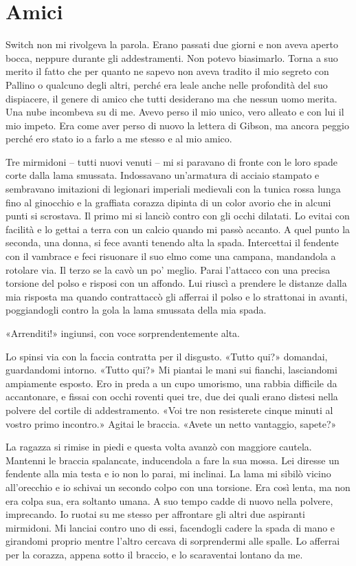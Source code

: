 \chapter{Amici}

Switch non mi rivolgeva la parola. Erano passati due giorni e non aveva
aperto bocca, neppure durante gli addestramenti. Non potevo biasimarlo.
Torna a suo merito il fatto che per quanto ne sapevo non aveva tradito
il mio segreto con Pallino o qualcuno degli altri, perché era leale
anche nelle profondità del suo dispiacere, il genere di amico che tutti
desiderano ma che nessun uomo merita. Una nube incombeva su di me. Avevo
perso il mio unico, vero alleato e con lui il mio impeto. Era come aver
perso di nuovo la lettera di Gibson, ma ancora peggio perché ero stato
io a farlo a me stesso e al mio amico.

Tre mirmidoni -- tutti nuovi venuti -- mi si paravano di fronte con le
loro spade corte dalla lama smussata. Indossavano un'armatura di acciaio
stampato e sembravano imitazioni di legionari imperiali medievali con la
tunica rossa lunga fino al ginocchio e la graffiata corazza dipinta di
un color avorio che in alcuni punti si scrostava. Il primo mi si lanciò
contro con gli occhi dilatati. Lo evitai con facilità e lo gettai a
terra con un calcio quando mi passò accanto. A quel punto la seconda,
una donna, si fece avanti tenendo alta la spada. Intercettai il fendente
con il vambrace e feci risuonare il suo elmo come una campana,
mandandola a rotolare via. Il terzo se la cavò un po' meglio. Parai
l'attacco con una precisa torsione del polso e risposi con un affondo.
Lui riuscì a prendere le distanze dalla mia risposta ma quando
contrattaccò gli afferrai il polso e lo strattonai in avanti,
poggiandogli contro la gola la lama smussata della mia spada.

«Arrenditi!» ingiunsi, con voce sorprendentemente alta.

Lo spinsi via con la faccia contratta per il disgusto. «Tutto qui?»
domandai, guardandomi intorno. «Tutto qui?» Mi piantai le mani sui
fianchi, lasciandomi ampiamente esposto. Ero in preda a un cupo
umorismo, una rabbia difficile da accantonare, e fissai con occhi
roventi quei tre, due dei quali erano distesi nella polvere del cortile
di addestramento. «Voi tre non resisterete cinque minuti al vostro primo
incontro.» Agitai le braccia. «Avete un netto vantaggio, sapete?»

La ragazza si rimise in piedi e questa volta avanzò con maggiore
cautela. Mantenni le braccia spalancate, inducendola a fare la sua
mossa. Lei diresse un fendente alla mia testa e io non lo parai, mi
inclinai. La lama mi sibilò vicino all'orecchio e io schivai un secondo
colpo con una torsione. Era così lenta, ma non era colpa sua, era
soltanto umana. A suo tempo cadde di nuovo nella polvere, imprecando. Io
ruotai su me stesso per affrontare gli altri due aspiranti mirmidoni. Mi
lanciai contro uno di essi, facendogli cadere la spada di mano e
girandomi proprio mentre l'altro cercava di sorprendermi alle spalle. Lo
afferrai per la corazza, appena sotto il braccio, e lo scaraventai
lontano da me.

